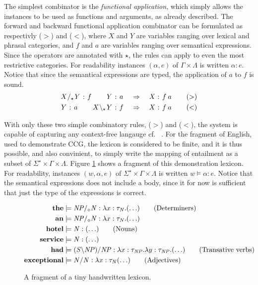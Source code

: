 The simplest combinator is the \emph{functional application}, which simply allows the instances to be used as functions and arguments, as already described. The forward and backward functional application combinator can be formulated as respectivly ($>$) and ($<$), where $X$ and $Y$ are variables ranging over lexical and phrasal categories, and $f$ and $a$ are variables ranging over semantical expressions. Since the operators are annotated with $\star$, the rules can apply to even the most restrictive categories. For readability instances $(\alpha, e)$ of $\Gamma \times \Lambda$ is written $\alpha : e$. Notice that since the semantical expressions are typed, the application of $a$ to $f$ is sound. 
\begin{align*}
  \catvar{X}/_\star \catvar{Y} : \fvar{f}  \quad\quad                  \catvar{Y} : \fvar{a} 
  &\quad\Rightarrow\quad
  \catvar{X} : \fvar{f} \fvar{a} 
  \tag{$>$} \\
  \catvar{Y}            : \fvar{a}  \quad\quad  \catvar{X} \bsl_\star \catvar{Y} : \fvar{f}
  &\quad\Rightarrow\quad
  \catvar{X} : \fvar{f} \fvar{a}
  \tag{$<$}
\end{align*}

With only these two simple combinatory rules, ($>$) and ($<$), the system is capable of capturing any context-free langauge cf.\ \citeauthor{sp} . For the fragment of English, used to demonstrate CCG, the lexicon is considered to be finite, and it is thus possible, and also convinient, to simply write the mapping of entailment as a subset of $\Sigma^\star \times \Gamma \times \Lambda$. Figure \ref{fig:TinyLex} shows a fragment of this demonstration lexicon. For readability, instances $(w, \alpha, e)$ of $\Sigma^\star \times \Gamma \times \Lambda$ is written $w \models \alpha : e$. Notice that the semantical expressions does not include a body, since it for now is sufficient that just the type of the expressions is correct.
\begin{figure}[ht]
\vspace{-.5em}
\begin{align*}
  \mathbf{the}       &\models {\mathit{NP}} /_\diamond {\mathit{N}}    : \lambda x : \tau_{\mathit{N}} . (\ldots)    \tag{Determiners} \\
  \mathbf{an}        &\models {\mathit{NP}} /_\diamond {\mathit{N}}    : \lambda x : \tau_{\mathit{N}} . (\ldots)    \\
  \mathbf{hotel}     &\models {\mathit{N}}               : (\ldots)                 \tag{Nouns} \\
  \mathbf{service}   &\models {\mathit{N}}               : (\ldots)                 \\
  \mathbf{had}       &\models ({\mathit{S}} \backslash {\mathit{NP}})/{\mathit{NP}}
                                                  : \lambda x : \tau_{\mathit{NP}} . \lambda y : \tau_{\mathit{NP}} . (\ldots)               \tag{Transative verbs} \\
  \mathbf{exceptional}   &\models {\mathit{N/N}}         : \lambda x : \tau_{\mathit{N}} (\ldots)                 \tag{Adjectives}  
\end{align*}
\vspace{-1em}
\caption{A fragment of a tiny handwritten lexicon.}
\label{fig:TinyLex}
\end{figure}

